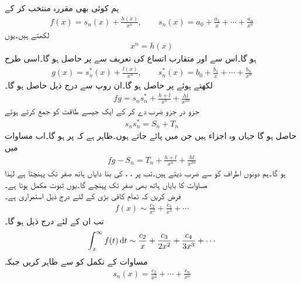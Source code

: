 ہم  کوئی بھی مقررہ  منتخب کر کے
\begin{align*}
f(x)=s_n(x)+\frac{h(x)}{x^n}, \qquad s_n(x)=a_0+\frac{a_1}{x}+\cdots+\frac{a_n}{x^n}
\end{align*}
لکھتے ہیں۔یوں
\begin{align*}
[f(x)-s_n(x)]x^n=h(x)
\end{align*}
ہو گا۔اس سے اور متقارب اتساع کی تعریف سے  پر  حاصل ہو گا۔اسی طرح
\begin{align*}
g(x)=s^*_n(x)+\frac{l(x)}{x^n}, \qquad s^*_n(x)=b_0+\frac{b_1}{x}+\cdots+\frac{b_n}{x^n}
\end{align*}
لکھتے ہوئے  پر  حاصل ہو گا۔ان روپ سے درج ذیل حاصل ہو گا۔
\begin{align*}
fg=s_ns^*_n+\frac{h+l}{x^n}+\frac{hl}{x^{2n}}
\end{align*}
جزو در جزو ضرب دے کر  کے ایک جیسے طاقت کو جمع کرتے ہوئے
\begin{align*}
s_ns^*_n=S_n+T_n
\end{align*}
حاصل ہو گا جہاں  وہ اجزاء ہیں جن میں  پائے جاتے ہوں۔ظاہر ہے کہ  پر  ہو گا۔اب مساوات  میں 
\begin{align*}
fg-S_n=T_n+\frac{h+l}{x^n}+\frac{hl}{x^{2n}}
\end{align*}
ہو گا۔ہم دونوں اطراف کو  سے ضرب دیتے ہیں۔تب  پر ، ،  کی بنا دایاں ہاتھ صفر تک پہنچتا ہے لہٰذا مساوات  کا بایاں ہاتھ بھی صفر تک پہنچے گا۔یوں ثبوت مکمل ہوتا ہے۔
\quad {}\\
فرض کریں کہ تمام کافی بڑی  کے لئے درج ذیل  استمراری ہے۔
\begin{align*}
f(x)\sim \frac{c_2}{x^2}+\frac{c_3}{x^3}+\cdots
\end{align*}
تب ان  کے لئے درج ذیل ہو گا۔
\begin{align}\label{مساوات_اعدادی_جزو_در_جزو_تکمل_الف}
\int_{x}^{\infty} f(t)\dif t\sim \frac{c_2}{x}+\frac{c_3}{2x^2}+\frac{c_4}{3x^3}+\cdots
\end{align}
\quad
مساوات  کے تکمل کو  سے ظاہر کریں جبکہ 
\begin{align*}
s_n(x)=\frac{c_2}{x^2}+\cdots+\frac{c_n}{x^n}
\end{align*}
